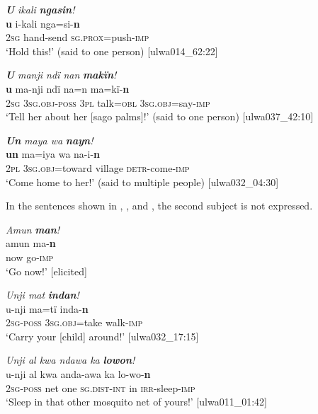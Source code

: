 \ea%
    \label{ex:syntax:69}
          \textbf{\textit{U}} \textit{ikali} \textbf{\textit{ngasin}}\textit{!}\\
\gll    \textbf{u}    i-kali    nga=si-\textbf{n}\\
    2\textsc{sg}  hand-send  \textsc{sg.prox}=push-\textsc{imp}\\
\glt `Hold this!’ (said to one person) [ulwa014\_62:22]
\z

\ea%
    \label{ex:syntax:70}
          \textbf{\textit{U}} \textit{manji ndï nan} \textbf{\textit{makïn}}\textit{!}\\
\gll    \textbf{u}    ma-nji      ndï  na=n    ma=kï-\textbf{n}\\
    2\textsc{sg}  3\textsc{sg.obj-poss}  3\textsc{pl}  talk=\textsc{obl}  3\textsc{sg.obj}=say-\textsc{imp}\\
\glt `Tell her about her [sago palms]!’ (said to one person) [ulwa037\_42:10]
\z

\ea%
    \label{ex:syntax:71}
          \textbf{\textit{Un}} \textit{maya wa} \textbf{\textit{nayn}}\textit{!}\\
\gll    \textbf{un}  ma=iya      wa    na-i-\textbf{n}\\
    2\textsc{pl}  3\textsc{sg.obj=}toward  village  \textsc{detr-}come-\textsc{imp}\\
\glt `Come home to her!’ (said to multiple people) [ulwa032\_04:30]
\z

In the  sentences shown in , , and , the second  subject is not expressed.

\ea%
    \label{ex:syntax:72}
          \textit{Amun} \textbf{\textit{man}}\textit{!}\\
\gll    amun  ma-\textbf{n}\\
    now  go-\textsc{imp}\\
\glt `Go now!’ [elicited]
\z

\ea%
    \label{ex:syntax:73}
          \textit{Unji mat} \textbf{\textit{indan}}\textit{!}\\
\gll    u-nji    ma=tï      inda-\textbf{n}\\
    2\textsc{sg-poss}  \textsc{3sg.obj=}take  walk-\textsc{imp}\\
\glt `Carry your [child] around!’ [ulwa032\_17:15]
\z

\ea%
    \label{ex:syntax:74}
          \textit{Unji al kwa ndawa ka} \textbf{\textit{lowon}}\textit{!}\\
\gll    u-nji    al  kwa  anda-awa    ka  lo-wo-\textbf{n}\\
    2\textsc{sg-poss}  net  one    \textsc{sg.dist-int}  in  \textsc{irr-}sleep-\textsc{imp}\\
\glt `Sleep in that other mosquito net of yours!’ [ulwa011\_01:42]
\z

